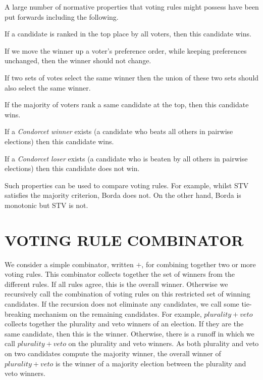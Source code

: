 \documentclass{ecai2012}
\newcommand{\winner}[2]{\mbox{$#1 + #2$}}
\newcommand{\topk}{\mbox{$+$}}
\begin{document}
A large number of normative properties
that voting rules might possess have been put forwards
including the following.

If a candidate is ranked in the top place by all voters,  then this candidate wins.

If we move the winner up a voter's preference
order, while keeping preferences unchanged,  then the winner should not change.

If two sets of votes select the same
winner then the union of these two
sets should also select the same winner.

If the majority of voters rank a same candidate at the top, then
this candidate wins.

If a {\em Condorcet winner} exists (a candidate
who beats all others in pairwise elections) then
this candidate wins.

If a {\em Condorcet loser} exists (a candidate
who is beaten by all others in pairwise elections) then
this candidate does not win.

Such properties can be used to compare voting
rules. For example, whilst
STV satisfies the majority criterion,
Borda does not. On the other hand,
Borda is monotonic but STV is not.

\section{VOTING RULE COMBINATOR}

We consider a simple combinator, written $\topk$, for
combining together two or more voting rules.
This combinator collects together the set of winners
from the different rules.
If all rules agree, this is the overall winner.
Otherwise we recursively
call the combination of voting
rules on this restricted set of winning candidates.
If the recursion
does not eliminate any candidates,
we call some tie-breaking mechanism on
the remaining candidates.
For example, $\winner{plurality}{veto}$
collects together the plurality and veto winners of
an election. If they are the same candidate, then
this is the winner. Otherwise, there is a runoff
in which we call
$\winner{plurality}{veto}$ on the plurality and veto winners.
As both plurality and veto on two candidates compute
the majority winner, the overall winner of
$\winner{plurality}{veto}$ is
the winner of a majority election between
the plurality and veto winners.
\end{document}

